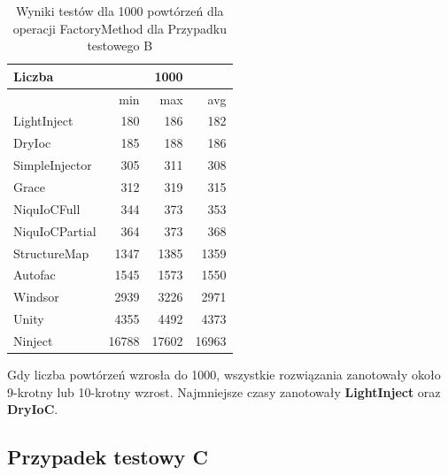 \documentclass[12pt]{article}
\begin{document}
\begin{table}[H]
\captionsetup{belowskip=0pt,aboveskip=0pt}
\begin{center}
\begin{small}
	\begin{tabular}{ | l | r r r | }
    		\hline
Liczba & & 1000 & \\ \hline
 & min & max & avg \\ \hline
LightInject & 180 & 186 & 182 \\ \hline
DryIoc & 185 & 188 & 186 \\ \hline
SimpleInjector & 305 & 311 & 308 \\ \hline
Grace & 312 & 319 & 315 \\ \hline
NiquIoCFull & 344 & 373 & 353 \\ \hline
NiquIoCPartial & 364 & 373 & 368 \\ \hline
StructureMap & 1347 & 1385 & 1359 \\ \hline
Autofac & 1545 & 1573 & 1550 \\ \hline
Windsor & 2939 & 3226 & 2971 \\ \hline
Unity & 4355 & 4492 & 4373 \\ \hline
Ninject & 16788 & 17602 & 16963 \\ \hline
  	\end{tabular}
\end{small}
\end{center}
\caption{Wyniki testów dla 1000 powtórzeń dla operacji FactoryMethod dla Przypadku testowego B}
\label{TestCaseB_FactoryMethod1000}
\end{table}
Gdy liczba powtórzeń wzrosła do 1000, wszystkie rozwiązania zanotowały około 9-krotny lub 10-krotny wzrost. Najmniejsze czasy zanotowały \textbf{LightInject} oraz \textbf{DryIoC}.


\subsection{Przypadek testowy C}
\end{document}
